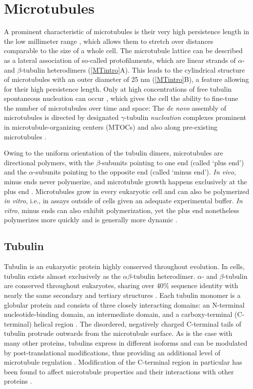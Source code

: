 \section{Microtubules}
A prominent characteristic of microtubules is their very high persistence length in the low millimeter range \parencite{Portran2013}, which allows them to stretch over distances comparable to the size of a whole cell. The microtubule lattice can be described as a lateral association of so-called protofilaments, which are linear strands of $\alpha$- and $\beta$-tubulin heterodimers (\autoref{MTintro}A). This leads to the cylindrical structure of microtubules with an outer diameter of 25 nm (\autoref{MTintro}B), a feature allowing for their high persistence length. Only at high concentrations of free tubulin spontaneous nucleation can occur \parencite{Fygenson1994}, which gives the cell the ability to fine-tune the number of microtubules over time and space: The \textit{de novo} assembly of microtubules is directed by designated $\gamma$-tubulin \textit{nucleation} complexes prominent in microtubule-organizing centers (MTOCs) and also along pre-existing microtubules \parencite{Guttinger2009, Janson2007}. \par
Owing to the uniform orientation of the tubulin dimers, microtubules are directional polymers, with the $\beta$-subunits pointing to one end (called ‘plus end’) and the $\alpha$-subunits pointing to the opposite end (called ‘minus end’). \textit{In vivo}, minus ends never polymerize, and microtubule growth happens exclusively at the plus end \parencite{dammer}. Microtubules grow in every eukaryotic cell and can also be polymerized \textit{in vitro}, i.e., in assays outside of cells given an adequate experimental buffer. \textit{In vitro}, minus ends can also exhibit polymerization, yet the plus end nonetheless polymerizes more quickly and is generally more dynamic \parencite{Howard2003}. 

\subsection{Tubulin}
Tubulin is an eukaryotic protein highly conserved throughout evolution. In cells, tubulin exists almost exclusively as the $\alpha\beta$-tubulin heterodimer. $\alpha$- and $\beta$-tubulin are conserved throughout eukaryotes, sharing over 40\% sequence identity with nearly the same secondary and tertiary structures \parencite{DOWNING199816}. Each tubulin monomer is a globular protein and consists of three closely interacting domains: an N-terminal nucleotide-binding domain, an intermediate domain, and a carboxy-terminal (C-terminal) helical region \parencite{ALUSHIN20141117}. The disordered, negatively charged C-terminal tails of tubulin protrude outwards from the microtubule surface. As is the case with many other proteins, tubulins express in different isoforms and can be modulated by post-translational modifications, thus providing an additional level of microtubule regulation \parencite{Janke2014}. Modification of the C-terminal region in particular has been found to affect microtubule properties and their interactions with other proteins \parencite{Janke2020}. 

